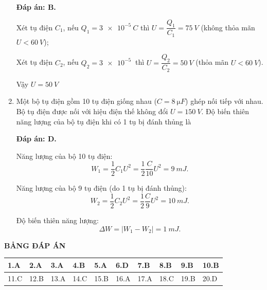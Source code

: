 \begin{enumerate}[label=\bfseries Câu \arabic*:]
{	}
	\loigiai
	{	\textbf{Đáp án: B.}
		
		Xét tụ điện $C_1$, nếu $Q_1=\SI{3e-5}{C}$ thì $U=\dfrac{Q_1}{C_1} = \SI{75}{V}$ (không thỏa mãn $U<\SI{60}{V}$);
		
		Xét tụ điện $C_2$, nếu $Q_2=\SI{3e-5}{}$ thì $U=\dfrac{Q_2}{C_2} = \SI{50}{V}$ (thỏa mãn $U< \SI{60}{V}$).
		
		Vậy $U=\SI{50}{V}$
	}
	\item {}
	
	\cauhoi
	{Một bộ tụ điện gồm 10 tụ điện giống nhau ($C=\SI{8}{\micro F}$) ghép nối tiếp với nhau. Bộ tụ điện được nối với hiệu điện thế không đổi $U=\SI{150}{V}$. Độ biến thiên năng lượng của bộ tụ điện khi có 1 tụ bị đánh thủng là
		
	}
	\loigiai
	{	\textbf{Đáp án: D.}
		
		Năng lượng của bộ 10 tụ điện:
		$$W_1=\dfrac{1}{2}C_1 U^2 = \dfrac{1}{2} \dfrac{C}{10} U^2 = \SI{9}{mJ}.$$
		
		Năng lượng của bộ 9 tụ điện (do 1 tụ bị đánh thủng):
		$$W_2=\dfrac{1}{2}C_2U^2 = \dfrac{1}{2}\dfrac{C}{9} U^2 = \SI{10}{mJ}.$$
		
		Độ biến thiên năng lượng:
		$$\Delta W = |W_1 - W_2| = \SI{1}{mJ}.$$
	}
\end{enumerate}

\whiteBGstarEnd

\loigiai
{
	\begin{center}
		\textbf{BẢNG ĐÁP ÁN}
	\end{center}
	\begin{center}
		\begin{tabular}{|m{2.8em}|m{2.8em}|m{2.8em}|m{2.8em}|m{2.8em}|m{2.8em}|m{2.8em}|m{2.8em}|m{2.8em}|m{2.8em}|}
			\hline
			1.A  & 2.A  & 3.A  & 4.B  & 5.A  & 6.D  & 7.B  & 8.B  & 9.B  & 10.B  \\
			\hline
			11.C  & 12.B  & 13.A  & 14.C  & 15.B  & 16.A  & 17.A  & 18.C  & 19.B  & 20.D  \\
			\hline
		\end{tabular}
	\end{center}
}
